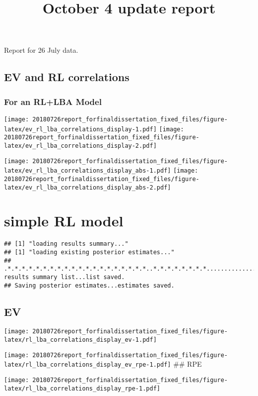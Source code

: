 \documentclass[]{article}
\title{October 4 update report}
\author{}
\date{}
\begin{document}
\maketitle

Report for 26 July data.

\subsection{EV and RL correlations}\label{ev-and-rl-correlations}

\subsubsection{For an RL+LBA Model}\label{for-an-rllba-model}

\texttt{[image: 20180726report\_forfinaldissertation\_fixed\_files/figure-latex/ev\_rl\_lba\_correlations\_display-1.pdf]}
\texttt{[image: 20180726report\_forfinaldissertation\_fixed\_files/figure-latex/ev\_rl\_lba\_correlations\_display-2.pdf]}

\texttt{[image: 20180726report\_forfinaldissertation\_fixed\_files/figure-latex/ev\_rl\_lba\_correlations\_display\_abs-1.pdf]}
\texttt{[image: 20180726report\_forfinaldissertation\_fixed\_files/figure-latex/ev\_rl\_lba\_correlations\_display\_abs-2.pdf]}

\section{simple RL model}\label{simple-rl-model}

\begin{verbatim}
## [1] "loading results summary..."
## [1] "loading existing posterior estimates..."
## .*.*.*.*.*.*.*.*.*.*.*.*.*.*.*.*.*.*.*.*..*.*.*.*.*.*.*.*......................................................................................*.*.*.*.*.*.*.*..*.*.*.*.*.*.*.*.*.*.*.*.*.*.*.*.*.*..*......*.*.*.*.*.*.*.*.*.*.*.*.*.*.*.*..*.*.*..*.*.*.*.........................................................................................*.*.*..*.*.*.*.*.*..*.*.*.*.*.*.*.*.*.*.*.*.*.*.*....*.*.*.*.*.*.*.*.*.*.*.*.*.*.*.*.*.*.*.*.*.*..*.*.*.*.*.......................................................................................*.*.*.*.*.*..*.*.*.*..*.*.*.*.*.*.*.*.*.*.*.*.*.*.*.....*.*.*.*.*.*.*..*.*.*.*.*..*.*.*..*.*.*.*.*.*.*.*.*.*........................................................................................*.*..*..*.*.*.*.*.*.*.*.*.*.*.*.*.*.*.*.*.*.*.*.*..*...saving results summary list...list saved. 
## Saving posterior estimates...estimates saved.
\end{verbatim}

\subsection{EV}\label{ev}

\texttt{[image: 20180726report\_forfinaldissertation\_fixed\_files/figure-latex/rl\_lba\_correlations\_display\_ev-1.pdf]}

\texttt{[image: 20180726report\_forfinaldissertation\_fixed\_files/figure-latex/rl\_lba\_correlations\_display\_ev\_rpe-1.pdf]}
\#\# RPE

\texttt{[image: 20180726report\_forfinaldissertation\_fixed\_files/figure-latex/rl\_lba\_correlations\_display\_rpe-1.pdf]}
\end{document}
